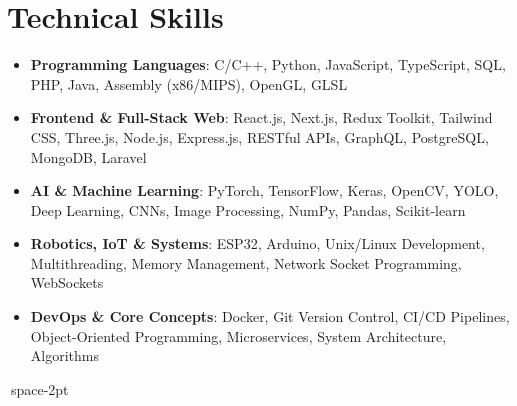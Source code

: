\documentclass[letterpaper,11pt]{article}
\newcommand{\resumeSubHeadingListStart}{\begin{itemize}[leftmargin=*]}
\newcommand{\resumeSubHeadingListEnd}{\end{itemize}}
\begin{document}
\section{Technical Skills}
 \resumeSubHeadingListStart
    \item{\textbf{Programming Languages}{: C/C++, Python, JavaScript, TypeScript, SQL, PHP, Java, Assembly (x86/MIPS), OpenGL, GLSL}}
    \item{\textbf{Frontend \& Full-Stack Web}{: React.js, Next.js, Redux Toolkit, Tailwind CSS, Three.js, Node.js, Express.js, RESTful APIs, GraphQL, PostgreSQL, MongoDB, Laravel}}
    \item{\textbf{AI \& Machine Learning}{: PyTorch, TensorFlow, Keras, OpenCV, YOLO, Deep Learning, CNNs, Image Processing, NumPy, Pandas, Scikit-learn}}
    \item{\textbf{Robotics, IoT \& Systems}{: ESP32, Arduino, Unix/Linux Development, Multithreading, Memory Management, Network Socket Programming, WebSockets}}
    \item{\textbf{DevOps \& Core Concepts}{: Docker, Git Version Control, CI/CD Pipelines, Object-Oriented Programming, Microservices, System Architecture, Algorithms}}
 \resumeSubHeadingListEnd
 space{-2pt}
\end{document}
